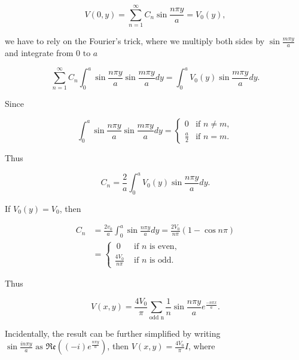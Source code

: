 \documentclass[english,a4paper,12pt]{report}
\begin{document}
{\begin{equation}
    V(0,y) = \sum_{n=1}^{\infty} C_{n} \sin \frac{n\pi y}{a} = V_0(y) ,
\end{equation}

we have to rely on the Fourier's trick, where we multiply both sides by \(\sin \frac{m\pi y}{a} \) and integrate from \(0 \text { to } a\)

\begin{equation}
    \sum_{n=1}^{\infty} C_{n} \int_{0}^{a} \sin \frac{n\pi y}{a} \sin \frac{m\pi y}{a} dy = \int_{0}^{a} V_0(y) \sin \frac{m\pi y}{a} dy.			 
\end{equation}

Since 

\begin{equation}
    \int_{0}^{a} \sin \frac{n\pi y}{a} \sin \frac{m\pi y}{a} dy = \begin{cases}
        0 & \text{if } n \neq m, \\[10pt]
        \displaystyle \frac{a}{2} & \text{if } n = m.
        \end{cases}
\end{equation}

Thus 

\begin{equation}
    C_{n}  = \frac{2}{a} \int_{0}^{a} V_0(y) \sin \frac{n\pi y}{a} dy.  
\end{equation}

If \(V_0(y) = V_0\), then 

\begin{equation}
    \begin{aligned}
        C_{n} &= \frac{2v_0}{a} \int_{0}^{a} \sin \frac{n\pi y}{a} dy = \frac{2V_0}{n\pi } (1 - \cos n\pi )  \\ 
        &= \begin{cases}
            ~ 0 &\text { if } n  \text{ is even}, \\
            \frac{4V_0}{n\pi } &\text { if } n \text{ is odd} .
        \end{cases} 
    \end{aligned}
\end{equation}

Thus

\begin{equation}
    V(x,y) = \frac{4V_0}{\pi } \sum_{\text{odd n}}^{} \frac{1}{n} \sin \frac{n\pi y}{a}  e^{\frac{-n\pi x}{a}}. 
\end{equation}

Incidentally, the result can be further simplified by writing \(\displaystyle \sin \frac{in\pi y}{a} \text{ as } \mathfrak{Re} ((-i)e^{\frac{n\pi y}{a} } )  \), then \(\displaystyle V(x,y) = \frac{4V_0 }{\pi } I\), where

}
\end{document}
